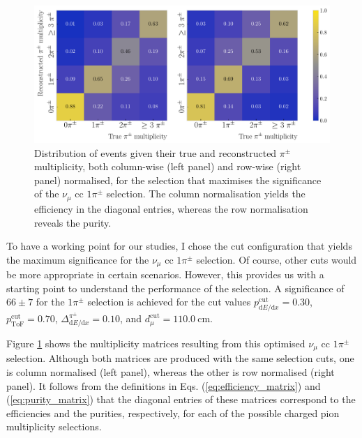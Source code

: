 \begin{figure}[t]
    \centering
    \includegraphics[width=.99\linewidth]{Images/GAr_selection/pion_selection_metrics_matrix_max_significance.pdf}
    \caption[Row and column normalised distributions of events given their true and reconstructed $\pi^{\pm}$ multiplicity.]{Distribution of events given their true and reconstructed $\pi^{\pm}$ multiplicity, both column-wise (left panel) and row-wise (right panel) normalised, for the selection that maximises the significance of the $\nu_{\mu}$ \gls{cc} $1\pi^{\pm}$ selection. The column normalisation yields the efficiency in the diagonal entries, whereas the row normalisation reveals the purity.}
    \label{fig:pion_selection_metrics}
\end{figure}

To have a working point for our studies, I chose the cut configuration that yields the maximum significance for the $\nu_{\mu}$ \gls{cc} $1\pi^{\pm}$ selection. Of course, other cuts would be more appropriate in certain scenarios. However, this provides us with a starting point to understand the performance of the selection. A significance of $66\pm7$ for the $1\pi^{\pm}$ selection is achieved for the cut values $p^{\mathrm{cut}}_{\mathrm{d}E/\mathrm{d}x} = 0.30$, $p^{\mathrm{cut}}_{\mathrm{ToF}} = 0.70$, $\Delta^{\pi^{\pm}}_{\mathrm{d}E/\mathrm{d}x} = 0.10$, and $d^{\mathrm{cut}}_{\mu} = 110.0~\mathrm{cm}$.

Figure \ref{fig:pion_selection_metrics} shows the multiplicity matrices resulting from this optimised $\nu_{\mu}$ \gls{cc} $1\pi^{\pm}$ selection. Although both matrices are produced with the same selection cuts, one is column normalised (left panel), whereas the other is row normalised (right panel). It follows from the definitions in Eqs. (\ref{eq:efficiency_matrix}) and (\ref{eq:purity_matrix}) that the diagonal entries of these matrices correspond to the efficiencies and the purities, respectively, for each of the possible charged pion multiplicity selections.

